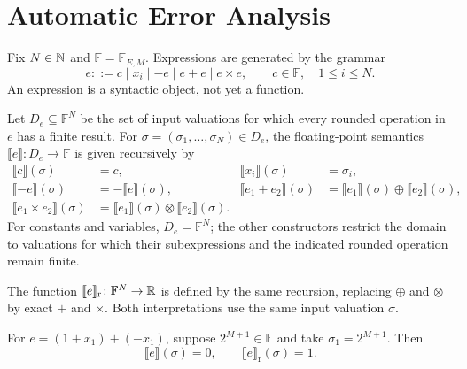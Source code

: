 \section{Automatic Error Analysis}
\begingroup
\setlength{\abovedisplayskip}{6pt}
\setlength{\belowdisplayskip}{6pt}
\setlength{\abovedisplayshortskip}{3pt}
\setlength{\belowdisplayshortskip}{4pt}

\begin{definition}
Fix $N\in\mathbb{N}$ and $\mathbb F=\mathbb F_{E, M}$.
Expressions are generated by the grammar
\[
 e::=c\mid x_i\mid-e\mid e+e\mid e\times e,
 \qquad c\in\mathbb F, \quad 1\le i\le N.
\]
An expression is a syntactic object, not yet a function.
\end{definition}

\begin{definition}
Let $D_e\subseteq\mathbb F^N$ be the set of input valuations
for which every rounded operation in $e$ has a finite result.
For $\sigma=(\sigma_1, \dots, \sigma_N)\in D_e$, the floating-point
semantics $\llbracket e\rrbracket\colon D_e\to\mathbb F$
is given recursively by
\[
\begin{aligned}
 \llbracket c\rrbracket(\sigma)&=c, &
 \llbracket x_i\rrbracket(\sigma)&=\sigma_i, \\
 \llbracket-e\rrbracket(\sigma)&=-\llbracket e\rrbracket(\sigma), &
 \llbracket e_1+e_2\rrbracket(\sigma)
 &=\llbracket e_1\rrbracket(\sigma)\oplus\llbracket e_2\rrbracket(\sigma), \\
 \llbracket e_1\times e_2\rrbracket(\sigma)
 &=\llbracket e_1\rrbracket(\sigma)\otimes\llbracket e_2\rrbracket(\sigma).
\end{aligned}
\]
For constants and variables, $D_e=\mathbb F^N$; the other
constructors restrict the domain to valuations for which their
subexpressions and the indicated rounded operation remain finite.
\end{definition}

\begin{definition}
The function
$\llbracket e\rrbracket_{\mathrm r}\colon\mathbb F^N\to\mathbb{R}$
is defined by the same recursion, replacing $\oplus$ and
$\otimes$ by exact $+$ and $\times$. Both interpretations
use the same input valuation $\sigma$.
\end{definition}

\begin{example}
For $e=(1+x_1)+(-x_1)$, suppose $2^{M+1}\in\mathbb F$
and take $\sigma_1=2^{M+1}$. Then
\[
 \llbracket e\rrbracket(\sigma)=0, \qquad
 \llbracket e\rrbracket_{\mathrm r}(\sigma)=1.
\]
\end{example}

